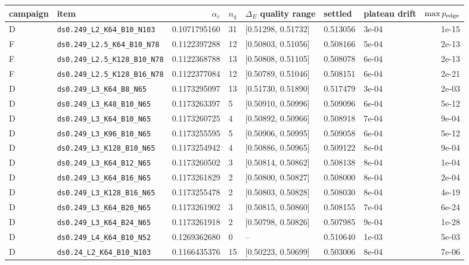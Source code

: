 \begin{longtable}{@{}llrllllr@{}}
\toprule
campaign & item & $\alpha_c$ & $n_q$ & $\Delta_E$ quality range & settled & plateau drift & $\max p_{\rm edge}$\\
\midrule
\endhead
D & \texttt{ds0.249\_L2\_K64\_B10\_N103} & 0.1071795160 & 31 & [0.51298, 0.51732] & 0.513056 & 3e-04 & 1e-15\\
F & \texttt{ds0.249\_L2.5\_K64\_B10\_N78} & 0.1122397288 & 12 & [0.50803, 0.51056] & 0.508166 & 5e-04 & 2e-13\\
F & \texttt{ds0.249\_L2.5\_K128\_B10\_N78} & 0.1122368788 & 13 & [0.50808, 0.51105] & 0.508078 & 6e-04 & 2e-13\\
F & \texttt{ds0.249\_L2.5\_K128\_B16\_N78} & 0.1122377084 & 12 & [0.50789, 0.51046] & 0.508151 & 6e-04 & 2e-21\\
D & \texttt{ds0.249\_L3\_K64\_B8\_N65} & 0.1173295097 & 13 & [0.51730, 0.51890] & 0.517479 & 3e-04 & 2e-03\\
D & \texttt{ds0.249\_L3\_K48\_B10\_N65} & 0.1173263397 & 5 & [0.50910, 0.50996] & 0.509096 & 6e-04 & 5e-12\\
D & \texttt{ds0.249\_L3\_K64\_B10\_N65} & 0.1173260725 & 4 & [0.50892, 0.50966] & 0.508918 & 7e-04 & 9e-04\\
D & \texttt{ds0.249\_L3\_K96\_B10\_N65} & 0.1173255595 & 5 & [0.50906, 0.50995] & 0.509058 & 6e-04 & 5e-12\\
D & \texttt{ds0.249\_L3\_K128\_B10\_N65} & 0.1173254942 & 4 & [0.50886, 0.50965] & 0.509122 & 8e-04 & 9e-04\\
D & \texttt{ds0.249\_L3\_K64\_B12\_N65} & 0.1173260502 & 3 & [0.50814, 0.50862] & 0.508138 & 8e-04 & 1e-04\\
D & \texttt{ds0.249\_L3\_K64\_B16\_N65} & 0.1173261829 & 2 & [0.50800, 0.50827] & 0.508000 & 8e-04 & 2e-04\\
D & \texttt{ds0.249\_L3\_K128\_B16\_N65} & 0.1173255478 & 2 & [0.50803, 0.50828] & 0.508030 & 8e-04 & 4e-19\\
D & \texttt{ds0.249\_L3\_K64\_B20\_N65} & 0.1173261902 & 3 & [0.50815, 0.50860] & 0.508155 & 7e-04 & 6e-24\\
D & \texttt{ds0.249\_L3\_K64\_B24\_N65} & 0.1173261918 & 2 & [0.50798, 0.50826] & 0.507985 & 9e-04 & 1e-28\\
D & \texttt{ds0.249\_L4\_K64\_B10\_N52} & 0.1269362680 & 0 & -- & 0.510640 & 1e-03 & 5e-03\\
D & \texttt{ds0.24\_L2\_K64\_B10\_N103} & 0.1166435376 & 15 & [0.50223, 0.50699] & 0.503006 & 8e-04 & 7e-06\\

\end{longtable}
